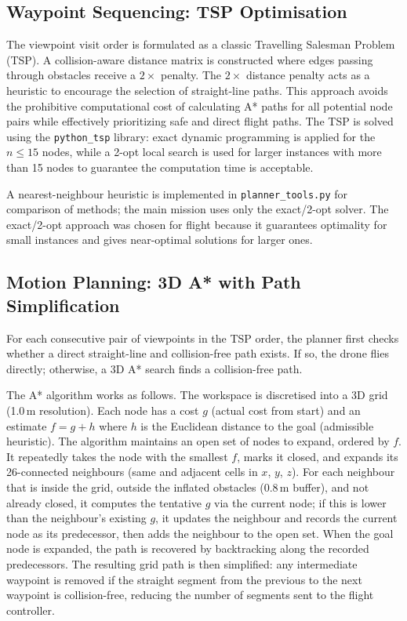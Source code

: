 \documentclass[11pt,a4paper]{article}
\begin{document}
\subsection{Waypoint Sequencing: TSP Optimisation}

The viewpoint visit order is formulated as a classic Travelling Salesman Problem (TSP). A collision-aware distance matrix is constructed where edges passing through obstacles receive a $2\times$ penalty. The $2\times$ distance penalty acts as a heuristic to encourage the selection of straight-line paths. This approach avoids the prohibitive computational cost of calculating A* paths for all potential node pairs while effectively prioritizing safe and direct flight paths.
The TSP is solved using the \texttt{python\_tsp} library: exact dynamic programming is applied for the $n \leq 15$ nodes, while a 2-opt local search is used for larger instances with more than 15 nodes to guarantee the computation time is acceptable.

A nearest-neighbour heuristic is implemented in \texttt{planner\_tools.py} for comparison of methods; the main mission uses only the exact/2-opt solver. The exact/2-opt approach was chosen for flight because it guarantees optimality for small instances and gives near-optimal solutions for larger ones. 

\subsection{Motion Planning: 3D A* with Path Simplification}

For each consecutive pair of viewpoints in the TSP order, the planner first checks whether a direct straight-line and collision-free path exists. If so, the drone flies directly; otherwise, a 3D A* search finds a collision-free path.

The A* algorithm works as follows. The workspace is discretised into a 3D grid (1.0\,m resolution). Each node has a cost $g$ (actual cost from start) and an estimate $f = g + h$ where $h$ is the Euclidean distance to the goal (admissible heuristic). The algorithm maintains an open set of nodes to expand, ordered by $f$. It repeatedly takes the node with the smallest $f$, marks it closed, and expands its 26-connected neighbours (same and adjacent cells in $x$, $y$, $z$). For each neighbour that is inside the grid, outside the inflated obstacles (0.8\,m buffer), and not already closed, it computes the tentative $g$ via the current node; if this is lower than the neighbour's existing $g$, it updates the neighbour and records the current node as its predecessor, then adds the neighbour to the open set. When the goal node is expanded, the path is recovered by backtracking along the recorded predecessors. The resulting grid path is then simplified: any intermediate waypoint is removed if the straight segment from the previous to the next waypoint is collision-free, reducing the number of segments sent to the flight controller.
\end{document}
